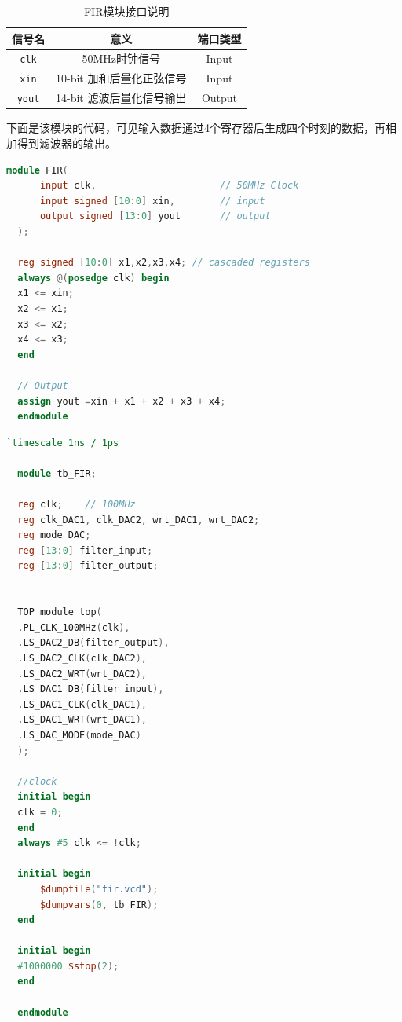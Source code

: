 \begin{table}[htbp]
  \centering
  \begin{tabular}{ccc}
    \toprule
     信号名 & 意义 & 端口类型\\
    \midrule
      \texttt{clk} & 50MHz时钟信号 & Input \\
     \texttt{xin} & 10-bit 加和后量化正弦信号 & Input \\
     \texttt{yout} & 14-bit 滤波后量化信号输出 & Output \\
    \bottomrule
  \end{tabular}
  \caption{FIR模块接口说明}
  \label{table:interface_fir}
\end{table}

下面是该模块的代码，可见输入数据通过4个寄存器后生成四个时刻的数据，再相加得到滤波器的输出。
\begin{lstlisting}[language=verilog,caption={FIR滤波器模块}]
module FIR(
      input clk,                      // 50MHz Clock
      input signed [10:0] xin,        // input
      output signed [13:0] yout       // output
  );
  
  reg signed [10:0] x1,x2,x3,x4; // cascaded registers
  always @(posedge clk) begin
  x1 <= xin; 
  x2 <= x1; 
  x3 <= x2; 
  x4 <= x3;
  end
  
  // Output
  assign yout =xin + x1 + x2 + x3 + x4; 
  endmodule
  \end{lstlisting}
\begin{lstlisting}[language=verilog, caption={Testbench文件}]
  `timescale 1ns / 1ps

  module tb_FIR;
  
  reg clk;    // 100MHz
  reg clk_DAC1, clk_DAC2, wrt_DAC1, wrt_DAC2;
  reg mode_DAC;
  reg [13:0] filter_input;
  reg [13:0] filter_output;
  
  
  TOP module_top(
  .PL_CLK_100MHz(clk), 
  .LS_DAC2_DB(filter_output),
  .LS_DAC2_CLK(clk_DAC2),
  .LS_DAC2_WRT(wrt_DAC2),
  .LS_DAC1_DB(filter_input),
  .LS_DAC1_CLK(clk_DAC1),
  .LS_DAC1_WRT(wrt_DAC1),
  .LS_DAC_MODE(mode_DAC)
  );
  
  //clock
  initial begin
  clk = 0; 
  end 
  always #5 clk <= !clk;    
  
  initial begin
      $dumpfile("fir.vcd");
      $dumpvars(0, tb_FIR);
  end
  
  initial begin
  #1000000 $stop(2);
  end
  
  endmodule
  
\end{lstlisting}

